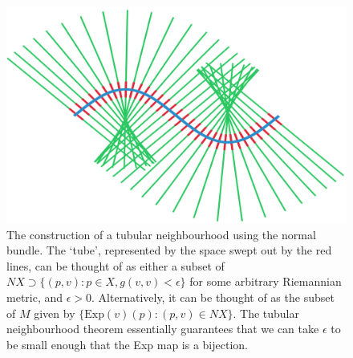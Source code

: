 \documentclass[11pt, final]{article}
\begin{document}
\begin{figure}
	\includegraphics[width=0.8\linewidth]{fig/TubularNeighbourhood}
	\caption{The construction of a tubular neighbourhood using the normal bundle. The `tube', represented by the space swept out by the red lines, can be thought of as either a subset of $NX \supset \{ (p,v) : p \in X, g(v,v) < \epsilon\} $ for some arbitrary Riemannian metric, and $\epsilon >0$. Alternatively, it can be thought of as the subset of $M$ given by $\{ \mathrm{Exp}(v)(p) : (p,v) \in NX \}$. The tubular neighbourhood theorem essentially guarantees that we can take $\epsilon$ to be small enough that the Exp map is a bijection.}\label{fig:tubularNeighbourhood}
\end{figure}
\end{document}

